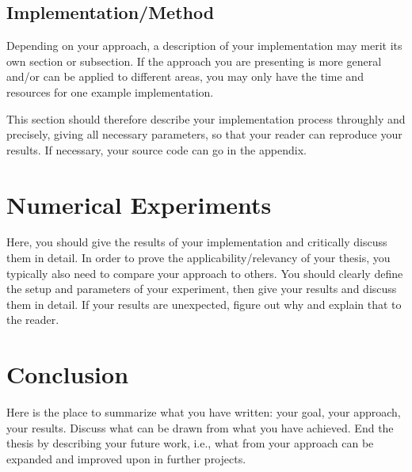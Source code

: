 \subsection{Implementation/Method}
Depending on your approach, a description of your implementation may merit its own section or subsection. If the approach you are presenting is more general and/or can be applied to different areas, you may only have the time and resources for one example implementation.

This section should therefore describe your implementation process throughly and precisely, giving all necessary parameters, so that your reader can reproduce your results. If necessary, your source code can go in the appendix. 


\section{Numerical Experiments}
Here, you should give the results of your implementation and critically discuss them in detail. In order to prove the applicability/relevancy of your thesis, you typically also need to compare your approach to others. You should clearly define the setup and parameters of your experiment, then give your results and discuss them in detail. If your results are unexpected, figure out why and explain that to the reader. 


\section{Conclusion}
Here is the place to summarize what you have written: your goal, your approach, your results. Discuss what can be drawn from what you have achieved. End the thesis by describing your future work, i.e., what from your approach can be expanded and improved upon in further projects.
